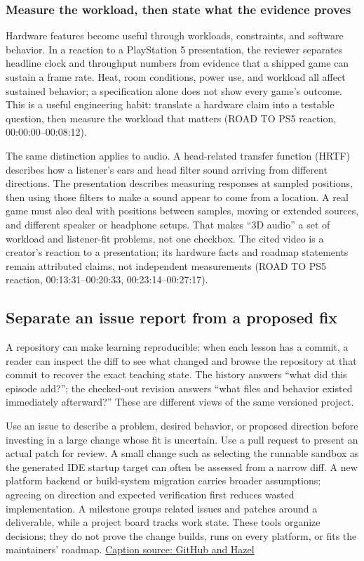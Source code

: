 \subsubsection{Measure the workload, then state what the evidence proves}\label{06-engine-ii-ch040-measure-the-workload-then-state-what-the-evidence-proves}

Hardware features become useful through workloads, constraints, and software behavior. In a reaction to a PlayStation 5 presentation, the reviewer separates headline clock and throughput numbers from evidence that a shipped game can sustain a frame rate. Heat, room conditions, power use, and workload all affect sustained behavior; a specification alone does not show every game's outcome. This is a useful engineering habit: translate a hardware claim into a testable question, then measure the workload that matters (ROAD TO PS5 reaction, 00:00:00--00:08:12).

The same distinction applies to audio. A head-related transfer function (HRTF) describes how a listener's ears and head filter sound arriving from different directions. The presentation describes measuring responses at sampled positions, then using those filters to make a sound appear to come from a location. A real game must also deal with positions between samples, moving or extended sources, and different speaker or headphone setups. That makes ``3D audio'' a set of workload and listener-fit problems, not one checkbox. The cited video is a creator's reaction to a presentation; its hardware facts and roadmap statements remain attributed claims, not independent measurements (ROAD TO PS5 reaction, 00:13:31--00:20:33, 00:23:14--00:27:17).

\subsection{Separate an issue report from a proposed fix}\label{06-engine-ii-ch040-separate-an-issue-report-from-a-proposed-fix}

A repository can make learning reproducible: when each lesson has a commit, a reader can inspect the diff to see what changed and browse the repository at that commit to recover the exact teaching state. The history answers ``what did this episode add?''; the checked-out revision answers ``what files and behavior existed immediately afterward?'' These are different views of the same versioned project.

Use an issue to describe a problem, desired behavior, or proposed direction before investing in a large change whose fit is uncertain. Use a pull request to present an actual patch for review. A small change such as selecting the runnable sandbox as the generated IDE startup target can often be assessed from a narrow diff. A new platform backend or build-system migration carries broader assumptions; agreeing on direction and expected verification first reduces wasted implementation. A milestone groups related issues and patches around a deliverable, while a project board tracks work state. These tools organize decisions; they do not prove the change builds, runs on every platform, or fits the maintainers' roadmap. \href{https://www.youtube.com/watch?v=DJEprZioFmU}{Caption source: GitHub and Hazel}

